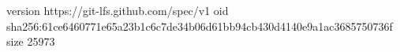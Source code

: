 version https://git-lfs.github.com/spec/v1
oid sha256:61ce6460771e65a23b1c6c7de34b06d61bb94cb430d4140e9a1ac3685750736f
size 25973
